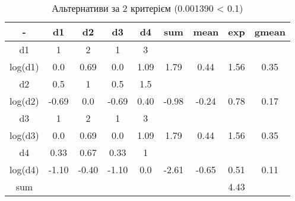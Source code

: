 \begin{table}[!ht]
    \centering
    \caption{Альтернативи за 2 критерієм (0.001390 < 0.1)}
    \label{tab:alternative_priorities2}

    \begin{tabular}{|c||c|c|c|c||c|c|c||c|}
        \toprule
        -       & d1    & d2    & d3    & d4   & sum   & mean  & exp  & gmean \\

        \midrule
        d1      & 1     & 2     & 1     & 3    &       &       &      &       \\
        log(d1) & 0.0   & 0.69  & 0.0   & 1.09 & 1.79  & 0.44  & 1.56 & 0.35  \\
        \hline
        d2      & 0.5   & 1     & 0.5   & 1.5  &       &       &      &       \\
        log(d2) & -0.69 & 0.0   & -0.69 & 0.40 & -0.98 & -0.24 & 0.78 & 0.17  \\
        \hline
        d3      & 1     & 2     & 1     & 3    &       &       &      &       \\
        log(d3) & 0.0   & 0.69  & 0.0   & 1.09 & 1.79  & 0.44  & 1.56 & 0.35  \\
        \hline
        d4      & 0.33  & 0.67  & 0.33  & 1    &       &       &      &       \\
        log(d4) & -1.10 & -0.40 & -1.10 & 0.0  & -2.61 & -0.65 & 0.51 & 0.11  \\

        \bottomrule
        sum     &       &       &       &      &       &       & 4.43 &       \\
        \hline
    \end{tabular}
\end{table}

